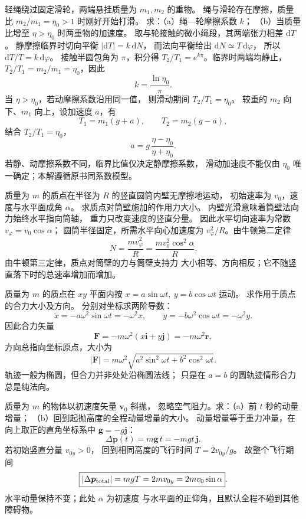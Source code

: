 轻绳绕过固定滑轮，两端悬挂质量为 $m_1,m_2$ 的重物。
绳与滑轮存在摩擦，质量比 $m_2/m_1=\eta_0>1$ 时刚好开始打滑。
求：（a）绳—轮摩擦系数 $k$；
（b）当质量比增至 $\eta>\eta_0$ 时两重物的加速度。
\exsolution
取与轮接触的微小绳段，其两端张力相差 $\mathrm dT$。
静摩擦临界时切向平衡
$|\mathrm dT|=k\,\mathrm dN$，
而法向平衡给出 $\mathrm dN\simeq T\,\mathrm d\varphi$，
所以 $\mathrm dT/T=k\,\mathrm d\varphi$。
接触半圆包角为 $\pi$，积分得
$T_2/T_1=e^{k\pi}$。临界时两端均静止，
$T_2/T_1=m_2/m_1=\eta_0$，因此
\[
\boxed{k=\frac{\ln\eta_0}{\pi}}.
\]
当 $\eta>\eta_0$，若动摩擦系数沿用同一值，
则滑动期间 $T_2/T_1=\eta_0$。
较重的 $m_2$ 向下、$m_1$ 向上，设加速度 $a$，有
\[
T_1=m_1(g+a),\qquad T_2=m_2(g-a),
\]
结合 $T_2/T_1=\eta_0$，
\[
\boxed{a=g\,\frac{\eta-\eta_0}{\eta+\eta_0}}.
\]
\excheck 若静、动摩擦系数不同，临界比值仅决定静摩擦系数，
滑动加速度不能仅由 $\eta_0$ 唯一确定；本解遵循原书同系数模型。

质量为 $m$ 的质点在半径为 $R$ 的竖直圆筒内壁无摩擦地运动，
初始速率为 $v_0$，速度与水平面成角 $\alpha$。
求质点对筒壁施加的作用力大小。
\exsolution
内壁光滑意味着筒壁法向力始终水平指向筒轴，
重力只改变速度的竖直分量。
因此水平切向速率为常数
$v_\varphi=v_0\cos\alpha$；
圆筒半径固定，所需水平向心加速度为
$v_\varphi^2/R$。由牛顿第二定律
\[
N=\frac{mv_\varphi^2}{R}
=\boxed{\frac{mv_0^2\cos^2\alpha}{R}}.
\]
\excheck 由牛顿第三定律，质点对筒壁的力与筒壁支持力
大小相等、方向相反；它不随竖直落下时的总速率增加而增加。

质量为 $m$ 的质点在 $xy$ 平面内按
$x=a\sin\omega t,\ y=b\cos\omega t$ 运动。
求作用于质点的合力大小及方向。
\exsolution
分别对坐标求两阶导数：
\[
\ddot x=-a\omega^2\sin\omega t=-\omega^2x,\qquad
\ddot y=-b\omega^2\cos\omega t=-\omega^2y.
\]
因此合力矢量
\[
\boxed{\bm F=-m\omega^2(x\bm i+y\bm j)
=-m\omega^2\bm r},
\]
方向总指向坐标原点，大小为
\[
\boxed{|\bm F|=m\omega^2
\sqrt{a^2\sin^2\omega t+b^2\cos^2\omega t}}.
\]
\excheck 轨迹一般为椭圆，但合力并非处处沿椭圆法线；
只是在 $a=b$ 的圆轨迹情形合力总是纯法向。

质量为 $m$ 的物体以初速度矢量 $\bm v_0$ 斜抛，
忽略空气阻力。求：（a）前 $t$ 秒的动量增量；
（b）回到起抛高度的全程动量增量的大小。
\exsolution
动量增量等于重力冲量，在向上取正的直角坐标系中
$\bm g=-g\bm j$：
\[
\boxed{\Delta\bm p(t)=m\bm g\,t=-mgt\,\bm j}.
\]
若初始竖直分量 $v_{0y}>0$，
回到相同高度的飞行时间 $T=2v_{0y}/g$。
故整个飞行期间
\[
\boxed{|\Delta\bm p_{\rm total}|=mgT
=2m v_{0y}=2m v_0\sin\alpha}.
\]
\excheck 水平动量保持不变；此处 $\alpha$ 为初速度
与水平面的正仰角，且默认全程不碰到其他障碍物。

